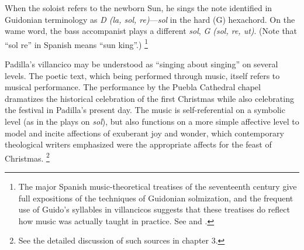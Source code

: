 \documentclass[oneside,12pt]{book}
\begin{document}
      When the soloist refers to the newborn Sun, he sings the note identified in Guidonian terminology as \emph{D (la, sol, re)}—\emph{sol} in the hard (G) hexachord.
      On the wame word, the bass accompanist plays a different \emph{sol}, \emph{G (sol, re, ut)}. (Note that \enquote{sol re} in Spanish means \enquote{sun king}.)%
\footnote{
	The major Spanish music-theoretical treatises of the seventeenth century give full expositions of the techniques of Guidonian solmization, and the frequent use of Guido's syllables in villancicos suggests that these treatises do reflect how music was actually taught in practice.
	See \autocite{Cerone1613} and \autocite{Lorente1672}.
      }
    
      Padilla's villancico may be understood as \enquote{singing about singing} on several levels.
      The poetic text, which being performed through music, itself refers to musical performance.
      The performance by the Puebla Cathedral chapel dramatizes the historical celebration of the first Christmas while also celebrating the festival in Padilla’s present day.
      The music is self-referential on a symbolic level (as in the plays on \emph{sol}), but also functions on a more simple affective level to model and incite affections of exuberant joy and wonder, which contemporary theological writers emphasized were the appropriate affects for the feast of Christmas.%
\footnote{
	See the detailed discussion of such sources in chapter 3.
      }
    
\end{document}
